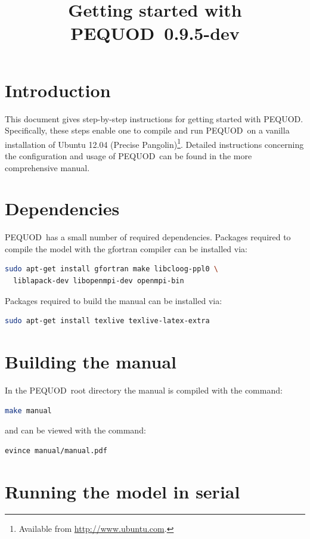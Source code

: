 \documentclass[a4paper]{article}
\newcommand{\pequod}{PEQUOD}
\newcommand{\version}{0.9.5-dev}
\begin{document}
\title{Getting started with \pequod\ \version}
\maketitle

\section{Introduction}

This document gives step-by-step instructions for getting started with \pequod.
Specifically, these steps enable one to compile and run \pequod\ on a vanilla
installation of Ubuntu 12.04 (Precise Pangolin)\footnote{Available from
\url{http://www.ubuntu.com}.}. Detailed instructions concerning the
configuration and usage of \pequod\ can be found in the more comprehensive
manual.

\section{Dependencies}

\pequod\ has a small number of required dependencies. Packages required to
compile the model with the gfortran compiler can be installed via:
\begin{lstlisting}[language = bash, frame = single]
sudo apt-get install gfortran make libcloog-ppl0 \
  liblapack-dev libopenmpi-dev openmpi-bin
\end{lstlisting}
Packages required to build the manual can be installed via:
\begin{lstlisting}[language = bash, frame = single]
sudo apt-get install texlive texlive-latex-extra
\end{lstlisting}

\section{Building the manual}

In the \pequod\ root directory the manual is compiled with the command:
\begin{lstlisting}[language = bash, frame = single]
make manual
\end{lstlisting}
and can be viewed with the command:
\begin{lstlisting}[language = bash, frame = single]
evince manual/manual.pdf
\end{lstlisting}

\section{Running the model in serial}
\end{document}
